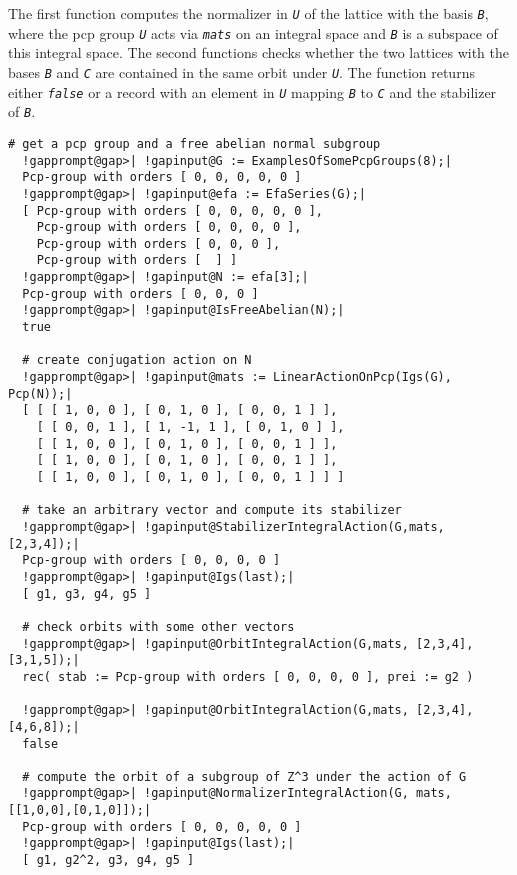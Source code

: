 \documentclass[a4paper,11pt]{report}
\begin{document}
{{{ The first function computes the normalizer in \mbox{\texttt{\mdseries\slshape U}} of the lattice with the basis \mbox{\texttt{\mdseries\slshape B}}, where the pcp group \mbox{\texttt{\mdseries\slshape U}} acts via \mbox{\texttt{\mdseries\slshape mats}} on an integral space and \mbox{\texttt{\mdseries\slshape B}} is a subspace of this integral space. The second functions checks whether the
two lattices with the bases \mbox{\texttt{\mdseries\slshape B}} and \mbox{\texttt{\mdseries\slshape C}} are contained in the same orbit under \mbox{\texttt{\mdseries\slshape U}}. The function returns either \mbox{\texttt{\mdseries\slshape false}} or a record with an element in \mbox{\texttt{\mdseries\slshape U}} mapping \mbox{\texttt{\mdseries\slshape B}} to \mbox{\texttt{\mdseries\slshape C}} and the stabilizer of \mbox{\texttt{\mdseries\slshape B}}. 
\begin{Verbatim}[commandchars=!@|,fontsize=\small,frame=single,label=Example]
  # get a pcp group and a free abelian normal subgroup
  !gapprompt@gap>| !gapinput@G := ExamplesOfSomePcpGroups(8);|
  Pcp-group with orders [ 0, 0, 0, 0, 0 ]
  !gapprompt@gap>| !gapinput@efa := EfaSeries(G);|
  [ Pcp-group with orders [ 0, 0, 0, 0, 0 ],
    Pcp-group with orders [ 0, 0, 0, 0 ],
    Pcp-group with orders [ 0, 0, 0 ],
    Pcp-group with orders [  ] ]
  !gapprompt@gap>| !gapinput@N := efa[3];|
  Pcp-group with orders [ 0, 0, 0 ]
  !gapprompt@gap>| !gapinput@IsFreeAbelian(N);|
  true
  
  # create conjugation action on N
  !gapprompt@gap>| !gapinput@mats := LinearActionOnPcp(Igs(G), Pcp(N));|
  [ [ [ 1, 0, 0 ], [ 0, 1, 0 ], [ 0, 0, 1 ] ],
    [ [ 0, 0, 1 ], [ 1, -1, 1 ], [ 0, 1, 0 ] ],
    [ [ 1, 0, 0 ], [ 0, 1, 0 ], [ 0, 0, 1 ] ],
    [ [ 1, 0, 0 ], [ 0, 1, 0 ], [ 0, 0, 1 ] ],
    [ [ 1, 0, 0 ], [ 0, 1, 0 ], [ 0, 0, 1 ] ] ]
  
  # take an arbitrary vector and compute its stabilizer
  !gapprompt@gap>| !gapinput@StabilizerIntegralAction(G,mats, [2,3,4]);|
  Pcp-group with orders [ 0, 0, 0, 0 ]
  !gapprompt@gap>| !gapinput@Igs(last);|
  [ g1, g3, g4, g5 ]
  
  # check orbits with some other vectors
  !gapprompt@gap>| !gapinput@OrbitIntegralAction(G,mats, [2,3,4],[3,1,5]);|
  rec( stab := Pcp-group with orders [ 0, 0, 0, 0 ], prei := g2 )
  
  !gapprompt@gap>| !gapinput@OrbitIntegralAction(G,mats, [2,3,4], [4,6,8]);|
  false
  
  # compute the orbit of a subgroup of Z^3 under the action of G
  !gapprompt@gap>| !gapinput@NormalizerIntegralAction(G, mats, [[1,0,0],[0,1,0]]);|
  Pcp-group with orders [ 0, 0, 0, 0, 0 ]
  !gapprompt@gap>| !gapinput@Igs(last);|
  [ g1, g2^2, g3, g4, g5 ]
\end{Verbatim}
 }

}}
\end{document}
